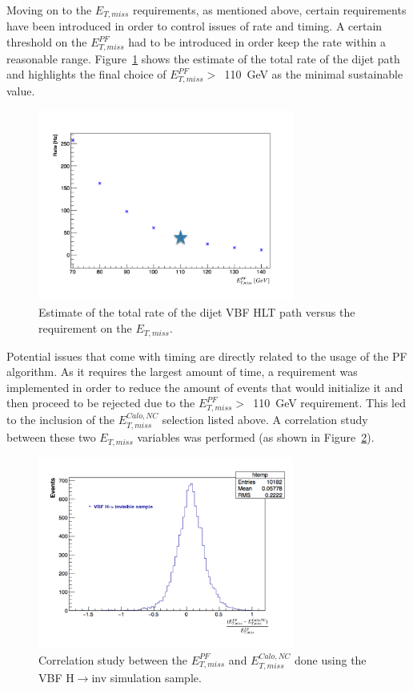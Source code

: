 \hspace{10pt} Moving on to the $E_{T,miss}$ requirements, as mentioned above, certain requirements have been introduced in order to control issues of rate and timing. A certain threshold on the $E^{PF}_{T,miss}$ had to be introduced in order keep the rate within a reasonable range. Figure~\ref{fig:PFMETvsRate} shows the estimate of the total rate of the dijet path and highlights the final choice of $E^{PF}_{T,miss}>$~110~GeV as the minimal sustainable value.
\begin{figure}[!htbp]
  \centering
    \includegraphics[width=0.75\textwidth]{CMS_experiment/PFMETvsRate.pdf}
  \caption{Estimate of the total rate of the dijet VBF HLT path versus the requirement on the $E_{T,miss}$.}
  \label{fig:PFMETvsRate}
\end{figure}
Potential issues that come with timing are directly related to the usage of the PF algorithm. As it requires the largest amount of time, a requirement was implemented in order to reduce the amount of events that would initialize it and then proceed to be rejected due to the $E^{PF}_{T,miss}>$~110~GeV requirement. This led to the inclusion of the $E^{Calo, NC}_{T,miss}$ selection listed above. A correlation study between these two $E_{T,miss}$ variables was performed (as shown in Figure~\ref{fig:VBF_rates_timing}). 
\begin{figure}[!htbp]
  \centering
    \includegraphics[width=0.75\textwidth]{CMS_experiment/PFvsCaloMET.pdf}
  \caption{Correlation study between the $E^{PF}_{T,miss}$ and $E^{Calo,NC}_{T,miss}$ done using the VBF H$\rightarrow$inv simulation sample.}
  \label{fig:VBF_rates_timing}
\end{figure}
